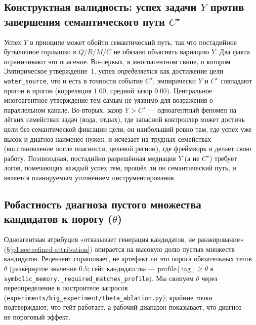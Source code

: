 \documentclass{article}
\newcommand{\method}[1]{\texttt{#1}}
\begin{document}
\subsection{Конструктная валидность: успех задачи $Y$ против завершения семантического пути $C^\star$}
\label{p1:app:y-vs-c}

Успех $Y$ в принципе может обойти семантический путь, так что постадийное бутылочное горлышко в $Q/R/M/C$ не обязано объяснять вариацию $Y$. Два факта ограничивают это опасение. Во-первых, в многоагентном свипе, о котором Эмпирическое утверждение~1, успех \emph{определяется} как достижение цели \texttt{water\_source}, что и есть в точности событие $C^\star$; эмпирически $Y$ и $C^\star$ совпадают прогон в прогон (корреляция $1.00$, средний зазор $0.00$). Центральное многоагентное утверждение тем самым не уязвимо для возражения о параллельном канале. Во-вторых, зазор $Y>C^\star$ --- одноагентный феномен на лёгких семействах задач (вода, отдых), где запасной контроллер может достичь цели без семантической фиксации цели; он наибольший ровно там, где успех уже высок и диагноз наименее нужен, и исчезает на трудных семействах (восстановление после опасности, целевой регион), где фреймворк и делает свою работу. Поэпизодная, постадийно разрешённая медиация $Y$ (а не $C^\star$) требует логов, помечающих каждый успех тем, прошёл ли он семантический путь, и является планируемым уточнением инструментирования.

\subsection{Робастность диагноза пустого множества кандидатов к порогу ($\theta$)}
\label{p1:app:theta-robustness}

Одноагентная атрибуция «отказывает генерация кандидатов, не ранжирование»
(\S\ref{p1:sec:refined-attribution}) опирается на высокую долю пустых множеств кандидатов.
Рецензент спрашивает, не артефакт ли это порога обязательных тегов
$\theta$ (развёрнутое значение $0.5$; гейт кандидатства ---
$\mathrm{profile}[\text{tag}]\ge\theta$ в
\method{symbolic\_memory.\_required\_matches\_profile}). Мы свипуем $\theta$ через
переопределение в построителе запросов (\method{experiments/big\_experiment/theta\_ablation.py});
крайние точки подтверждают, что гейт работает, а рабочий диапазон показывает, что
диагноз --- не пороговый эффект.
\end{document}
